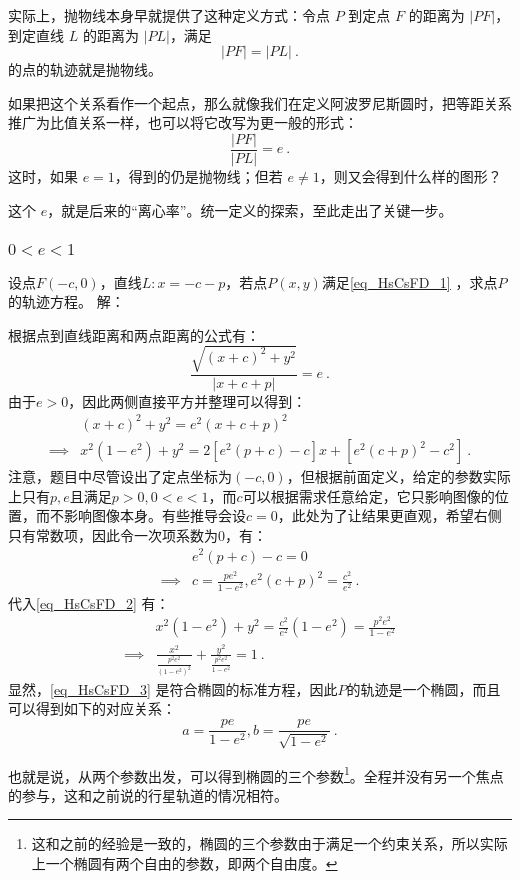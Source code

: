 实际上，抛物线本身早就提供了这种定义方式：令点 $P$ 到定点 $F$ 的距离为 $|PF|$，到定直线 $L$ 的距离为 $|PL|$，满足
$$
|PF| = |PL|~.
$$
的点的轨迹就是抛物线。

如果把这个关系看作一个起点，那么就像我们在定义阿波罗尼斯圆时，把等距关系推广为比值关系一样，也可以将它改写为更一般的形式：
$$
\frac{|PF|}{|PL|} = e~.
$$
这时，如果 $e = 1$，得到的仍是抛物线；但若 $e \ne 1$，则又会得到什么样的图形？

这个 $e$，就是后来的“离心率”。统一定义的探索，至此走出了关键一步。


\subsubsection{$0<e<1$}

\begin{example}{设点$F(-c,0)$，直线$L:x=-c-p$，若点$P(x,y)$满足\autoref{eq_HsCsFD_1} ，求点$P$的轨迹方程。}\label{ex_HsCsFD_1}
解：

根据点到直线距离和两点距离的公式有：
\begin{equation}
\frac{\sqrt{(x + c)^2 + y^2}}{|x + c + p|} = e~.
\end{equation}
由于$e>0$，因此两侧直接平方并整理可以得到：
\begin{equation}\label{eq_HsCsFD_2}
\begin{split}
&(x + c)^2 + y^2 = e^2(x + c + p)^2\\\implies &x^2(1 - e^2)+ y^2=2[e^2(p+c)-c]x + [e^2(c + p)^2 - c^2]~.
\end{split}
\end{equation}
注意，题目中尽管设出了定点坐标为$(-c,0)$，但根据前面定义，给定的参数实际上只有$p,e$且满足$p>0,0<e<1$，而$c$可以根据需求任意给定，它只影响图像的位置，而不影响图像本身。有些推导会设$c=0$，此处为了让结果更直观，希望右侧只有常数项，因此令一次项系数为$0$，有：
\begin{equation}
\begin{split}
&e^2(p+c)-c=0\\\implies &c=\frac{pe^2}{1-e^2},e^2(c+p)^2=\frac{c^2}{e^2}~.
\end{split}
\end{equation}
代入\autoref{eq_HsCsFD_2} 有：
\begin{equation}\label{eq_HsCsFD_3}
\begin{split}
&x^2(1 - e^2)+ y^2= \frac{c^2}{e^2}(1-e^2)=\frac{p^2 e^2}{1-e^2}\\
\implies&\frac{x^2}{\displaystyle\frac{p^2 e^2}{(1-e^2)^2}}+ \frac{y^2}{\displaystyle\frac{p^2 e^2}{1-e^2}}= 1~.
\end{split}
\end{equation}
显然，\autoref{eq_HsCsFD_3} 是符合椭圆的标准方程，因此$P$的轨迹是一个椭圆，而且可以得到如下的对应关系：
\begin{equation}
a=\frac{p e}{1-e^2},b=\frac{p e}{\sqrt{1-e^2}}~.
\end{equation}
\end{example}
也就是说，从两个参数出发，可以得到椭圆的三个参数\footnote{这和之前的经验是一致的，椭圆的三个参数由于满足一个约束关系，所以实际上一个椭圆有两个自由的参数，即两个自由度。}。全程并没有另一个焦点的参与，这和之前说的行星轨道的情况相符。

